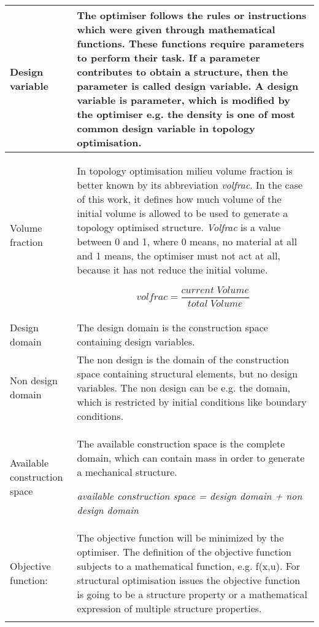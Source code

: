 \begin{longtable}{L{0.2\textwidth} L{0.8\textwidth}}
\hline
Design variable & The optimiser follows the rules or instructions which were given through mathematical functions. These functions require parameters to perform their task. If a parameter contributes to obtain a structure, then the parameter is called design variable.
A design variable is parameter, which is modified by the optimiser e.g. the density 
is one of most common design variable in topology optimisation. \\
 \hline
% 
%
%
Volume fraction & In topology optimisation milieu volume fraction is better known by its abbreviation \textit{volfrac}. In the case of this work, it defines how much volume of the initial volume is allowed to be used to generate a topology optimised structure.
 \textit{Volfrac} is a value between 0 and 1, where 0 means, no material at all and 1 means, the optimiser must not act at all, because it has not reduce the initial volume.
 
$$ volfrac = \frac{current \; Volume}{total \; Volume}$$\\

\hline

Design domain & The design domain is the construction space containing design variables. \\
 \hline 

Non design domain & The non design is the
domain of the construction space containing structural elements,
but no design variables. The non design can be
e.g. the domain, which is restricted by initial 
conditions like boundary conditions. \\
\hline

Available construction space & The available construction space is the complete domain, which can contain mass in order to generate a mechanical structure.

\textit{available construction space = design domain + non design domain} \\

\hline

Objective function: & The objective function will be minimized
by the optimiser. The definition of the objective
function subjects to a mathematical function, e.g. f(x,u). 
For structural optimisation issues the objective function is going to be a structure property or a mathematical expression of multiple structure properties. \\
\hline


\end{longtable}
